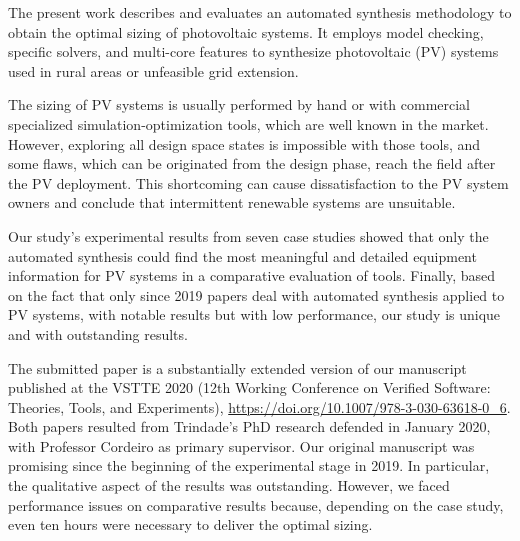 \documentclass[11pt]{article}
\begin{document}
The present work describes and evaluates an automated synthesis methodology to obtain the optimal sizing of photovoltaic systems. It employs model checking, specific solvers, and multi-core features to synthesize photovoltaic (PV) systems used in rural areas or unfeasible grid extension.

The sizing of PV systems is usually performed by hand or with commercial specialized simulation-optimization tools, which are well known in the market. However, exploring all design space states is impossible with those tools, and some flaws, which can be originated from the design phase, reach the field after the PV deployment. This shortcoming can cause dissatisfaction to the PV system owners and conclude that intermittent renewable systems are unsuitable.
   
Our study's experimental results from seven case studies showed that only the automated synthesis could find the most meaningful and detailed equipment information for PV systems in a comparative evaluation of tools. Finally, based on the fact that only since 2019 papers deal with automated synthesis applied to PV systems, with notable results but with low performance, our study is unique and with outstanding results.

The submitted paper is a substantially extended version of our
manuscript published at the VSTTE 2020 (12th Working Conference on Verified Software: Theories, Tools, and Experiments), \url{https://doi.org/10.1007/978-3-030-63618-0_6}.
Both papers resulted from Trindade's PhD research defended in January 2020, with Professor Cordeiro as primary supervisor.
Our original manuscript was promising since the beginning of the experimental stage in 2019. In particular, the qualitative aspect of the results was outstanding. However, we faced performance issues on comparative results because, depending on the case study, even ten hours were necessary to deliver the optimal sizing. 
\end{document}
